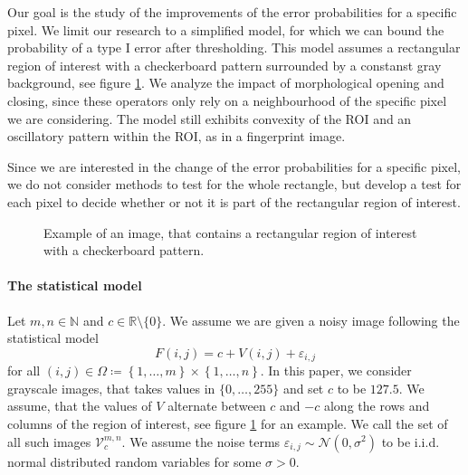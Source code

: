 \documentclass[a4paper,12pt]{article}
\theoremstyle{plain}
\theoremstyle{definition}
\begin{document}
Our goal is the study of the improvements of the error probabilities for a specific pixel. We limit our research to a simplified model, for which we can bound the probability of a type I error after thresholding. This model assumes a rectangular region of interest with a checkerboard pattern surrounded by a constanst gray background, see figure \ref{examplerROI}. We analyze the impact of morphological opening and closing, since these operators only rely on a neighbourhood of the specific pixel we are considering. The model still exhibits convexity of the ROI and an oscillatory pattern within the ROI, as in a fingerprint image.

Since we are interested in the change of the error probabilities for a specific pixel, we do not consider methods to test for the whole rectangle, but develop a test for each pixel to decide whether or not it is part of the rectangular region of interest.

\begin{figure}[h]
	\centering
	\caption{Example of an image, that contains a rectangular region of interest with a checkerboard pattern.}
	\label{examplerROI}
\end{figure}

\paragraph{The statistical model}

Let $m, n \in \mathbb{N}$ and $c \in \mathbb{R} \setminus \{ 0 \}$. We assume we are given a noisy image following the statistical model
\begin{equation}\label{introductionstatmodel}
	F(i, j) = c + V(i, j) + \varepsilon_{i, j}
\end{equation}
for all $(i, j) \in \Omega \coloneqq \left\{ 1, \dots, m \right\} \times \left\{ 1, \dots, n \right\}$. In this paper, we consider grayscale images, that takes values in $\{ 0, \dots, 255 \}$ and set $c$ to be $127.5$. We assume, that the values of $V$ alternate between $c$ and $-c$ along the rows and columns of the region of interest, see figure \ref{examplerROI} for an example. We call the set of all such images $\mathcal{V}_c^{m, n}$. We assume the noise terms $\varepsilon_{i, j} \sim \mathcal{N}(0, \sigma^2)$ to be i.i.d. normal distributed random variables for some $\sigma > 0$.
\end{document}
